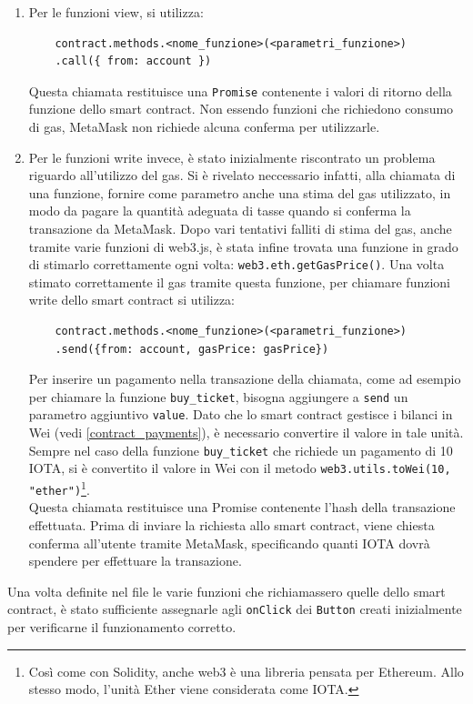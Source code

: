 \documentclass[12pt,a4paper,openright,twoside]{report}
\begin{document}
\begin{enumerate}\label{app_payments}
    \item Per le funzioni view, si utilizza:
    \begin{verbatim}
    contract.methods.<nome_funzione>(<parametri_funzione>)
    .call({ from: account })
    \end{verbatim} 
    Questa chiamata restituisce una \texttt{Promise} contenente i valori di ritorno della funzione dello smart contract. Non essendo funzioni che richiedono consumo di gas, MetaMask non richiede alcuna conferma per utilizzarle.
    \item Per le funzioni write invece, è stato inizialmente riscontrato un problema riguardo all'utilizzo del gas. Si è rivelato neccessario infatti, alla chiamata di una funzione, fornire come parametro anche una stima del gas utilizzato, in modo da pagare la quantità adeguata di tasse quando si conferma la transazione da MetaMask. Dopo vari tentativi falliti di stima del gas, anche tramite varie funzioni di web3.js, è stata infine trovata una funzione in grado di stimarlo correttamente ogni volta: \texttt{web3.eth.getGasPrice()}. Una volta stimato correttamente il gas tramite questa funzione, per chiamare funzioni write dello smart contract si utilizza:
    \begin{verbatim}
    contract.methods.<nome_funzione>(<parametri_funzione>)
    .send({from: account, gasPrice: gasPrice})
    \end{verbatim}
    Per inserire un pagamento nella transazione della chiamata, come ad esempio per chiamare la funzione \texttt{buy\_ticket}, bisogna aggiungere a \texttt{send} un parametro aggiuntivo \texttt{value}. Dato che lo smart contract gestisce i bilanci in Wei (vedi \ref{contract_payments}), è necessario convertire il valore in tale unità. Sempre nel caso della funzione \texttt{buy\_ticket} che richiede un pagamento di 10 IOTA, si è convertito il valore in Wei con il metodo \texttt{web3.utils.toWei(10, "ether")}\footnote{Così come con Solidity, anche web3 è una libreria pensata per Ethereum. Allo stesso modo, l'unità Ether viene considerata come IOTA.}.\\
    Questa chiamata restituisce una Promise contenente l'hash della transazione effettuata. Prima di inviare la richiesta allo smart contract, viene chiesta conferma all'utente tramite MetaMask, specificando quanti IOTA dovrà spendere per effettuare la transazione.
\end{enumerate}
Una volta definite nel file le varie funzioni che richiamassero quelle dello smart contract, è stato sufficiente assegnarle agli \texttt{onClick} dei \texttt{Button} creati inizialmente per verificarne il funzionamento corretto.\\
\end{document}
